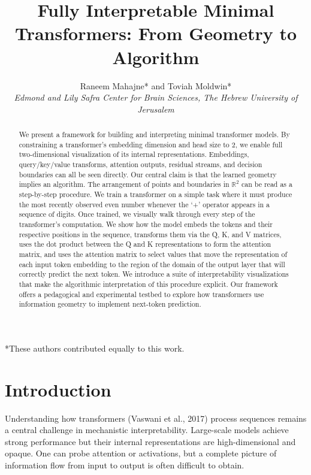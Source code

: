\documentclass[
  11pt,
  a4paper,
]{article}
\date{}
\title{Fully Interpretable Minimal Transformers: From Geometry to
Algorithm}
\author{Raneem Mahajne* and Toviah
Moldwin*\\[0.45em]{\normalsize\itshape Edmond and Lily Safra Center for
Brain Sciences, The Hebrew University of Jerusalem}}
\date{}
\begin{document}
\maketitle
\begin{abstract}
We present a framework for building and interpreting minimal transformer
models. By constraining a transformer's embedding dimension and head
size to \(2\), we enable full two-dimensional visualization of its
internal representations. Embeddings, query/key/value transforms,
attention outputs, residual streams, and decision boundaries can all be
seen directly. Our central claim is that the learned geometry implies an
algorithm. The arrangement of points and boundaries in \(\mathbb{R}^2\)
can be read as a step-by-step procedure. We train a transformer on a
simple task where it must produce the most recently observed even number
whenever the `+' operator appears in a sequence of digits. Once trained,
we visually walk through every step of the transformer's computation. We
show how the model embeds the tokens and their respective positions in
the sequence, transforms them via the Q, K, and V matrices, uses the dot
product between the Q and K representations to form the attention
matrix, and uses the attention matrix to select values that move the
representation of each input token embedding to the region of the domain
of the output layer that will correctly predict the next token. We
introduce a suite of interpretability visualizations that make the
algorithmic interpretation of this procedure explicit. Our framework
offers a pedagogical and experimental testbed to explore how
transformers use information geometry to implement next-token
prediction.
\end{abstract}

*These authors contributed equally to this work.

\section{Introduction}\label{introduction}

Understanding how transformers (Vaswani et al., 2017) process sequences
remains a central challenge in mechanistic interpretability. Large-scale
models achieve strong performance but their internal representations are
high-dimensional and opaque. One can probe attention or activations, but
a complete picture of information flow from input to output is often
difficult to obtain.
\end{document}
